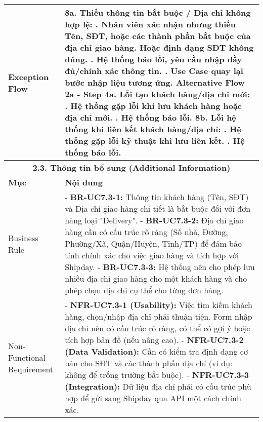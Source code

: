 \begin{longtable}{|m{4cm}|p{11cm}|}
Exception Flow & \textbf{8a. Thiếu thông tin bắt buộc / Địa chỉ không hợp lệ:} \newline    1. Nhân viên xác nhận nhưng thiếu Tên, SĐT, hoặc các thành phần bắt buộc của địa chỉ giao hàng. Hoặc định dạng SĐT không đúng. \newline    2. Hệ thống báo lỗi, yêu cầu nhập đầy đủ/chính xác thông tin. \newline    3. Use Case quay lại bước nhập liệu tương ứng. \newline \textbf{Alternative Flow 2a - Step 4a. Lỗi tạo khách hàng/địa chỉ mới:} \newline    1. Hệ thống gặp lỗi khi lưu khách hàng hoặc địa chỉ mới. \newline    2. Hệ thống báo lỗi. \newline \textbf{8b. Lỗi hệ thống khi liên kết khách hàng/địa chỉ:} \newline    1. Hệ thống gặp lỗi kỹ thuật khi lưu liên kết. \newline    2. Hệ thống báo lỗi. \\
\hline
\multicolumn{2}{|c|}{\textbf{2.3. Thông tin bổ sung (Additional Information)}} \\
\hline
\textbf{Mục} & \textbf{Nội dung} \\
\hline
Business Rule & - \textbf{BR-UC7.3-1:} Thông tin khách hàng (Tên, SĐT) và Địa chỉ giao hàng chi tiết là bắt buộc đối với đơn hàng loại "Delivery". \newline - \textbf{BR-UC7.3-2:} Địa chỉ giao hàng cần có cấu trúc rõ ràng (Số nhà, Đường, Phường/Xã, Quận/Huyện, Tỉnh/TP) để đảm bảo tính chính xác cho việc giao hàng và tích hợp với Shipday. \newline - \textbf{BR-UC7.3-3:} Hệ thống nên cho phép lưu nhiều địa chỉ giao hàng cho một khách hàng và cho phép chọn địa chỉ cụ thể cho từng đơn hàng. \\
\hline
Non-Functional Requirement & - \textbf{NFR-UC7.3-1 (Usability):} Việc tìm kiếm khách hàng, chọn/nhập địa chỉ phải thuận tiện. Form nhập địa chỉ nên có cấu trúc rõ ràng, có thể có gợi ý hoặc tích hợp bản đồ (nếu nâng cao). \newline - \textbf{NFR-UC7.3-2 (Data Validation):} Cần có kiểm tra định dạng cơ bản cho SĐT và các thành phần địa chỉ (ví dụ: không để trống trường bắt buộc). \newline - \textbf{NFR-UC7.3-3 (Integration):} Dữ liệu địa chỉ phải có cấu trúc phù hợp để gửi sang Shipday qua API một cách chính xác. \\
\hline
\end{longtable}

